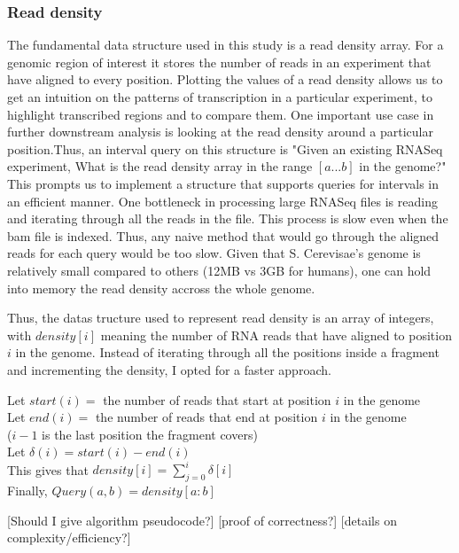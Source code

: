 \documentclass[12pt]{article}
\begin{document}
\subsubsection{Read density}\label{density}
The fundamental data structure used in this study is a read density array. For a genomic region of interest it stores the number of reads in an experiment that have aligned to every position. Plotting the values of a read density allows us to get an intuition on the patterns of transcription in a particular experiment, to highlight transcribed regions and to compare them. One important use case in further downstream analysis is looking at the read density around a particular position.Thus, an interval query on this structure is "Given an existing RNASeq experiment, What is the read density array in the range $[a...b]$ in the genome?" 
This prompts us to implement a structure that supports queries for intervals in an efficient manner. One bottleneck in processing large RNASeq files is reading and iterating through all the reads in the file. This process is slow even when the bam file is indexed. Thus, any naive method that would go through the aligned reads for each query would be too slow. Given that S. Cerevisae's genome is relatively small compared to others (12MB vs 3GB for humans), one can hold into memory the read density accross the whole genome.

Thus, the datas tructure used to represent read density is an array of integers, with $density[i]$ meaning the number of RNA reads that have aligned to position $i$ in the genome. Instead of iterating through all the positions inside a fragment and incrementing the density, I opted for a faster approach. 



\begin{center}
Let $start(i) =$ the number of reads that start at position $i$ in the genome \\
Let $end(i) =$ the number of reads that end at position $i$ in the genome \\
($i-1$ is the last position the fragment covers) \\
Let $\delta(i) = start(i) - end(i)$ \\
This gives that $density[i] = \sum\limits_{j=0}^i \delta[i]$ \\
Finally, $Query(a, b) = density[a:b]$

\end{center}

[Should I give algorithm pseudocode?]
[proof of correctness?]
[details on complexity/efficiency?]
\end{document}
